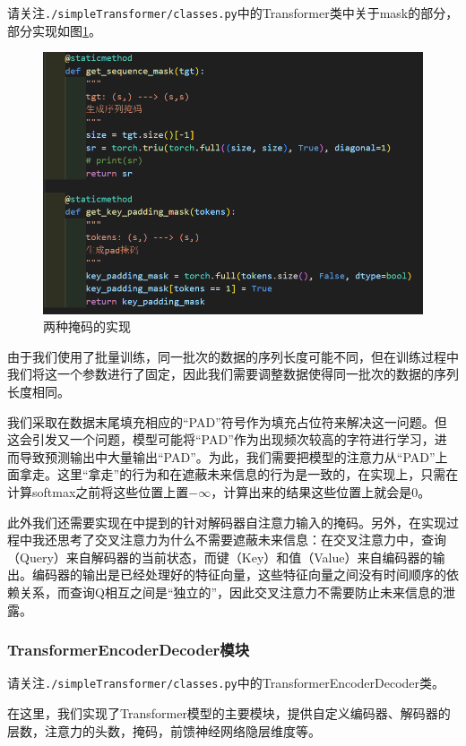 请关注\texttt{./simpleTransformer/classes.py}中的Transformer类中关于mask的部分，部分实现如图\ref{fig:simpletT-mask}。

\begin{figure}[h]
    \centering
    \includegraphics[width=0.8\linewidth]{img/simpleT/simpleT-mask.png}
    \caption{两种掩码的实现}
    \label{fig:simpletT-mask}
\end{figure}

由于我们使用了批量训练，同一批次的数据的序列长度可能不同，但在训练过程中我们将这一个参数进行了固定，因此我们需要调整数据使得同一批次的数据的序列长度相同。

我们采取在数据末尾填充相应的“PAD”符号作为填充占位符来解决这一问题。但这会引发又一个问题，模型可能将“PAD”作为出现频次较高的字符进行学习，进而导致预测输出中大量输出“PAD”。为此，我们需要把模型的注意力从“PAD”上面拿走。这里“拿走”的行为和在遮蔽未来信息的行为是一致的，在实现上，只需在计算softmax之前将这些位置上置$-\infty$，计算出来的结果这些位置上就会是$0$。

此外我们还需要实现在\label{sec-2:mask}中提到的针对解码器自注意力输入的掩码。另外，在实现过程中我还思考了交叉注意力为什么不需要遮蔽未来信息：在交叉注意力中，查询（Query）来自解码器的当前状态，而键（Key）和值（Value）来自编码器的输出。编码器的输出是已经处理好的特征向量，这些特征向量之间没有时间顺序的依赖关系，而查询Q相互之间是“独立的”，因此交叉注意力不需要防止未来信息的泄露。

\subsubsection{TransformerEncoderDecoder模块}

请关注\texttt{./simpleTransformer/classes.py}中的TransformerEncoderDecoder类。

在这里，我们实现了Transformer模型的主要模块，提供自定义编码器、解码器的层数，注意力的头数，掩码，前馈神经网络隐层维度等。

